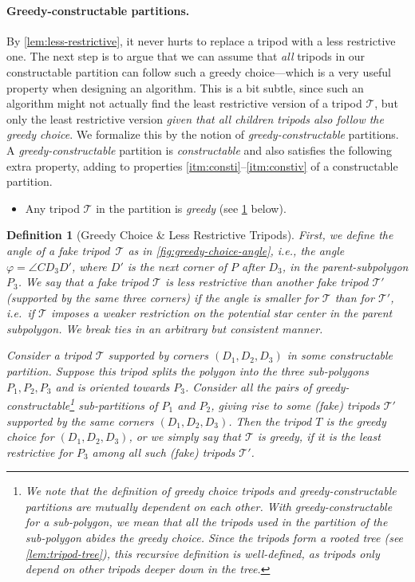 \documentclass[10pt,a4paper]{article}
\newtheorem{definition}{Definition}[section]
\begin{document}
\paragraph{Greedy-constructable partitions.}
By \cref{lem:less-restrictive}, it never hurts to replace a tripod with a less restrictive one. The next step is to argue that we can assume that \emph{all} tripods in our constructable partition can follow such a greedy choice---which is a very useful property when designing an algorithm. This is a bit subtle, since such an algorithm might not actually find the least restrictive version of a tripod $\mathcal{T}$, but only the least restrictive version \emph{given that all children tripods also follow the greedy choice}. We formalize this by the notion of \emph{greedy-constructable} partitions.
A \emph{greedy-constructable} partition is \emph{constructable} and also satisfies the following extra property, adding to properties \ref{itm:consti}--\ref{itm:constiv} of a constructable partition.
\begin{itemize}
\item[(v)] Any tripod $\mathcal{T}$ in the partition is \emph{greedy} (see \cref{def:greedy-choice} below).
\end{itemize}

\begin{definition}[Greedy Choice \& Less Restrictive Tripods]
\label{def:greedy-choice}
First, we define the \emph{angle} of a fake tripod~$\mathcal{T}$ as in \cref{fig:greedy-choice-angle}, i.e., the angle $\varphi = \angle CD_3D'$, where $D'$ is the next corner of $P$ after $D_3$, in the parent-subpolygon $P_3$.
We say that a fake tripod $\mathcal{T}$ is \emph{less restrictive} than another fake tripod $\mathcal{T}'$ (supported by the same three corners) if the angle is smaller for $\mathcal{T}$ than for $\mathcal{T}'$, i.e.\ if $\mathcal{T}$ imposes a weaker restriction on the potential star center in the parent subpolygon.
We break ties in an arbitrary but consistent manner.

Consider a tripod $\mathcal{T}$ supported by corners $(D_1, D_2, D_3)$ in some constructable partition. Suppose this tripod splits the polygon into the three sub-polygons $P_1, P_2, P_3$ and is oriented towards $P_3$. Consider all the pairs of \emph{greedy-constructable}\footnote{We note that the definition of \emph{greedy choice} tripods and \emph{greedy-constructable} partitions are mutually dependent on each other. With greedy-constructable for a sub-polygon, we mean that all the tripods used in the partition of the sub-polygon abides the greedy choice. Since the tripods form a rooted tree (see \cref{lem:tripod-tree}), this recursive definition is well-defined, as tripods only depend on other tripods deeper down in the tree.} sub-partitions of $P_1$ and $P_2$, giving rise to some (fake) tripods $\mathcal{T}'$ supported by the same corners $(D_1, D_2, D_3)$. Then the tripod $T$ is the \emph{greedy choice} for $(D_1,D_2,D_3)$, or we simply say that $\mathcal{T}$ is \emph{greedy}, if it is the \emph{least restrictive} for $P_3$ among all such (fake) tripods $\mathcal{T}'$.
\end{definition}
 
\end{document}
